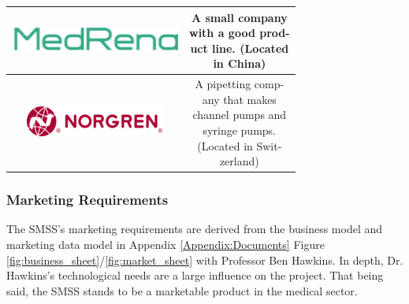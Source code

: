 \documentclass[journal]{IEEEtran}
\begin{document}
\begin{table}[H]
\begin{center}
\begin{tabular}{|c|c|}
                        \includegraphics[scale=0.5]{medrena}
                        \cite{goog_device}&
                        \makecell[l]{A small company \\
                                     with a good prod-\\
                                     uct line. (Located\\
                                     in China)}\\
                        \hline
                        
                        \includegraphics[scale=0.5]{norgren}
                        \cite{goog_device}&
                        \makecell[l]{A pipetting comp-\\
                                     any that makes \\
                                     channel pumps and\\
                                     syringe pumps. \\
                                     (Located in Swit-\\
                                     zerland)}\\
                        \hline
                        
                        
        
                    \end{tabular}
                \end{center}
            \end{table}
            
        \subsubsection{Marketing Requirements}
            The SMSS's marketing requirements are derived from the business model and marketing data model in Appendix \ref{Appendix:Documents} Figure \ref{fig:business_sheet}/\ref{fig:market_sheet} with Professor Ben Hawkins. In depth, Dr. Hawkins's technological needs are a large influence on the project. That being said, the SMSS stands to be a marketable product in the medical sector.
            
\end{document}
